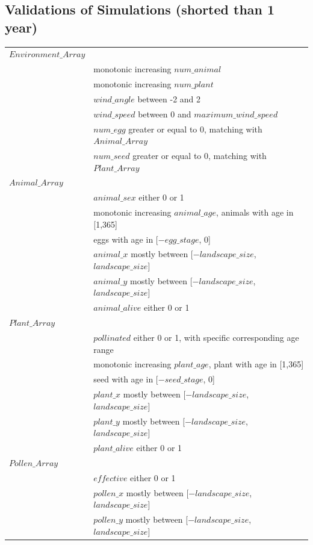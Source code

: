 \documentclass[3p,,preprint,12pt]{elsarticle}
\begin{document}
\subsection{\textbf{Validations of Simulations (shorted than 1 year)}}
\begin{table}[!htb]
\begin{tabular}{ l l }
 $Environment\_Array$ & \\
 & monotonic increasing $num\_animal$\\
 & monotonic increasing $num\_plant$\\
 & $wind\_angle$ between -2 and 2 \\
 & $wind\_speed$ between 0 and $maximum\_wind\_speed$\\
 & $num\_egg$ greater or equal to 0, matching with $Animal\_Array$\\
 & $num\_seed$ greater or equal to 0, matching with $Plant\_Array$\\
 $Animal\_Array$ & \\
 & $animal\_sex$ either 0 or 1\\
 & monotonic increasing $animal\_age$, animals with age in [1,365]\\
 & eggs with age in [$-egg\_stage$, 0]\\
 & $animal\_x$ mostly between [$-landscape\_size$, $landscape\_size$]\\
 & $animal\_y$ mostly between [$-landscape\_size$, $landscape\_size$]\\
 & $animal\_alive$ either 0 or 1\\
 $Plant\_Array$ & \\
 & $pollinated$ either 0 or 1, with specific corresponding age range\\
 & monotonic increasing $plant\_age$, plant with age in [1,365]\\
 & seed with age in [$-seed\_stage$, 0]\\
 & $plant\_x$ mostly between [$-landscape\_size$, $landscape\_size$]\\
 & $plant\_y$ mostly between [$-landscape\_size$, $landscape\_size$]\\
 & $plant\_alive$ either 0 or 1\\
 $Pollen\_Array$ & \\
 & $effective$ either 0 or 1\\
 & $pollen\_x$ mostly between [$-landscape\_size$, $landscape\_size$]\\
 & $pollen\_y$ mostly between [$-landscape\_size$, $landscape\_size$]\\

\end{tabular}
\end{table}
\end{document}
